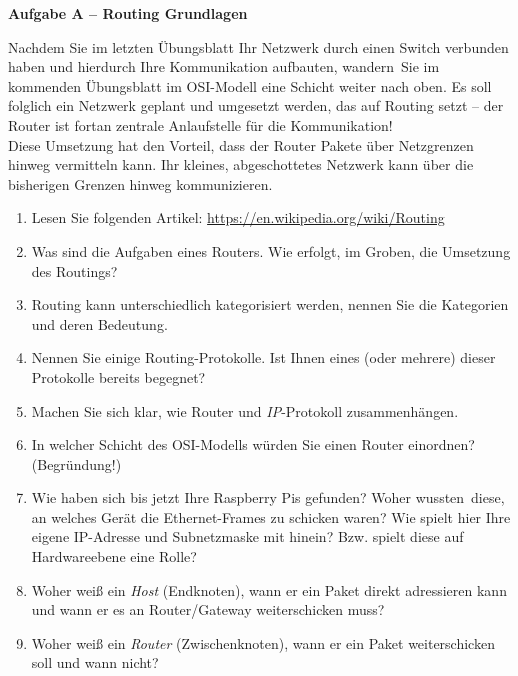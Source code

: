 \documentclass[paper=a4,fontsize=11pt]{scrartcl}%
\numberwithin{equation}{section}
\begin{document}
\begin{center}
\Large{\textbf{Aufgabe A -- Routing Grundlagen}}
\end{center}
\vskip0.25in
Nachdem Sie im letzten Übungsblatt Ihr Netzwerk durch einen Switch verbunden haben und hierdurch Ihre Kommunikation aufbauten, \glqq wandern\grqq\ Sie im kommenden Übungsblatt im OSI-Modell eine Schicht weiter nach oben. Es soll folglich ein Netzwerk geplant und umgesetzt werden, das auf Routing setzt -- der Router ist fortan zentrale Anlaufstelle für die Kommunikation!\\
Diese Umsetzung hat den Vorteil, dass der Router Pakete über Netzgrenzen hinweg vermitteln kann. Ihr kleines, abgeschottetes Netzwerk kann über die bisherigen Grenzen hinweg kommunizieren.
\begin{enumerate}
	\item Lesen Sie folgenden Artikel: \url{https://en.wikipedia.org/wiki/Routing}
	\item Was sind die Aufgaben eines Routers. Wie erfolgt, im Groben, die Umsetzung des Routings?
	\item Routing kann unterschiedlich kategorisiert werden, nennen Sie die Kategorien und deren Bedeutung.
	\item Nennen Sie einige Routing-Protokolle. Ist Ihnen eines (oder mehrere) dieser Protokolle bereits begegnet?
	\item Machen Sie sich klar, wie Router und \emph{IP}-Protokoll zusammenhängen.
	\item In welcher Schicht des OSI-Modells würden Sie einen Router einordnen? (Begründung!)
	\item Wie haben sich bis jetzt Ihre Raspberry Pis gefunden? Woher \glqq wussten\grqq\ diese, an welches Gerät die Ethernet-Frames zu schicken waren? Wie spielt hier Ihre eigene IP-Adresse und Subnetzmaske mit hinein? Bzw. spielt diese auf Hardwareebene eine Rolle?
	\item Woher weiß ein \textit{Host} (Endknoten), wann er ein Paket direkt adressieren kann und wann er es an Router/Gateway weiterschicken muss?
	\item Woher weiß ein \textit{Router} (Zwischenknoten), wann er ein Paket weiterschicken soll und wann nicht?
\end{enumerate}
\end{document}

